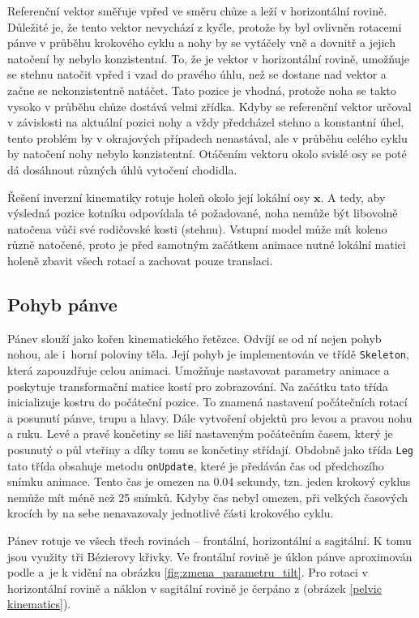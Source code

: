 Referenční vektor směřuje vpřed ve směru chůze a leží v horizontální rovině. Důležité je, že tento vektor nevychází z kyčle, protože by byl ovlivněn rotacemi pánve v průběhu krokového cyklu a nohy by se vytáčely vně a dovnitř a jejich natočení by nebylo konzistentní. To, že je vektor v horizontální rovině, umožňuje se stehnu natočit vpřed i vzad do pravého úhlu, než se dostane nad vektor a začne se nekonzistentně natáčet. Tato pozice je vhodná, protože noha se takto vysoko v průběhu chůze dostává velmi zřídka. Kdyby se referenční vektor určoval v závislosti na aktuální pozici nohy a vždy předcházel stehno a konstantní úhel, tento problém by v okrajových případech nenastával, ale v průběhu celého cyklu by natočení nohy nebylo konzistentní. Otáčením vektoru okolo svislé osy se poté dá dosáhnout různých úhlů vytočení chodidla.

Řešení inverzní kinematiky rotuje holeň okolo její lokální osy $\mathbf{x}$. A tedy, aby  výsledná pozice kotníku odpovídala té požadované, noha nemůže být libovolně natočena vůči své rodičovské kosti (stehnu). Vstupní model může mít koleno různě natočené, proto je před samotným začátkem animace nutné lokální matici holeně zbavit všech rotací a zachovat pouze translaci.

\subsection{Pohyb pánve}
Pánev slouží jako kořen kinematického řetězce. Odvíjí se od ní nejen pohyb nohou, ale i~horní poloviny těla. Její pohyb je implementován ve třídě \texttt{Skeleton}, která zapouzdřuje celou animaci. Umožňuje nastavovat parametry animace a poskytuje transformační matice kostí pro zobrazování.  Na začátku tato třída inicializuje kostru do počáteční pozice. To znamená nastavení počátečních rotací a posunutí pánve, trupu a hlavy. Dále vytvoření objektů pro levou a pravou nohu a ruku. Levé a pravé končetiny se liší nastaveným počátečním časem, který je posunutý o půl vteřiny a díky tomu se končetiny střídají. Obdobně jako třída \texttt{Leg} tato třída obsahuje metodu \texttt{onUpdate}, které je předáván čas od předchozího snímku animace. Tento čas je omezen na 0.04 sekundy, tzn. jeden krokový cyklus nemůže mít méně než 25 snímků. Kdyby čas nebyl omezen, při velkých časových krocích by na sebe nenavazovaly jednotlivé části krokového cyklu.

Pánev rotuje ve všech třech rovinách -- frontální, ho\-ri\-zontální a sagitální. K tomu jsou využity tři Bézierovy křivky. Ve frontální rovině je úklon pánve aproximován podle \cite{lin2014quantitative} a~je k vidění na obrázku \ref{fig:zmena_parametru_tilt}. Pro rotaci v horizontální rovině a náklon v sagitální rovině je čerpáno z \cite{biomechanika_chuze} (obrázek \ref{pelvic kinematics}).

